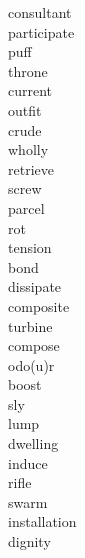 \documentclass[a4paper, 11pt]{ctexart}
\begin{document}
\begin{multicols*}{3}
\begin{description}
\item[consultant]

\item[participate]

\item[puff]

\item[throne]

\item[current]

\item[outfit]

\item[crude]

\item[wholly]

\item[retrieve]

\item[screw]

\item[parcel]

\item[rot]

\item[tension]

\item[bond]

\item[dissipate]

\item[composite]

\item[turbine]

\item[compose]

\item[odo(u)r]

\item[boost]

\item[sly]

\item[lump]

\item[dwelling]

\item[induce]

\item[rifle]

\item[swarm]

\item[installation]

\item[dignity]


\end{description}
\end{multicols*}
\end{document}
